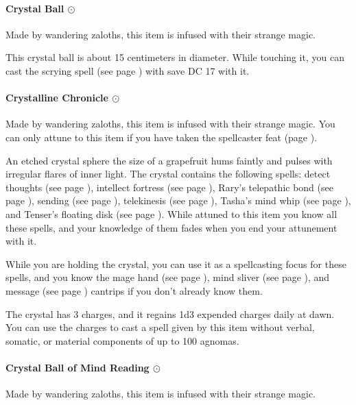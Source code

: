     \paragraph{Crystal Ball $\odot$}
        Made by wandering zaloths, this item is infused with their strange magic.

        This crystal ball is about 15 centimeters in diameter.
        While touching it, you can cast the scrying spell (see page \pageref{spell::scrying}) with save DC 17 with it.
    \paragraph{Crystalline Chronicle $\odot$}
        Made by wandering zaloths, this item is infused with their strange magic.
        You can only attune to this item if you have taken the spellcaster feat (page \pageref{feat::spellcaster}).

        An etched crystal sphere the size of a grapefruit hums faintly and pulses with irregular flares of inner light.
        The crystal contains the following spells: detect thoughts (see page \pageref{spell::detectthoughts}), intellect fortress (see page \pageref{spell::intellectfortress}), Rary's telepathic bond (see page \pageref{spell::rarystelepathicbond}), sending (see page \pageref{spell::sending}), telekinesis (see page \pageref{spell::telekinesis}), Tasha's mind whip (see page \pageref{spell::tashasmindwhip}), and Tenser's floating disk (see page \pageref{spell::tensersfloatingdisc}).
        While attuned to this item you know all these spells, and your knowledge of them fades when you end your attunement with it.

        While you are holding the crystal, you can use it as a spellcasting focus for these spells, and you know the mage hand (see page \pageref{spell::magehand}), mind sliver (see page \pageref{spell::mindsliver}), and message (see page \pageref{spell::message}) cantrips if you don't already know them.

        The crystal has 3 charges, and it regains 1d3 expended charges daily at dawn.
        You can use the charges to cast a spell given by this item without verbal, somatic, or material components of up to 100 agnomas.
    \paragraph{Crystal Ball of Mind Reading $\odot$}
        Made by wandering zaloths, this item is infused with their strange magic.

